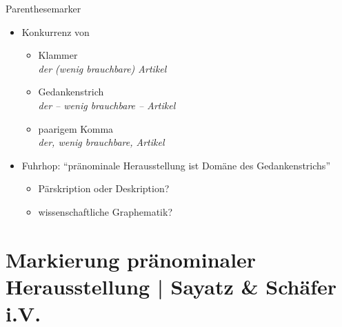 \begin{frame}
  {Parenthesemarker}
  \begin{itemize}[<+->]
    \item Konkurrenz von
      \begin{itemize}[<+->]
        \item Klammer\\
          \textit{\alert{der (wenig brauchbare) Artikel}}
        \item Gedankenstrich\\
          \textit{\alert{der -- wenig brauchbare -- Artikel}}
        \item paarigem Komma\\
          \textit{\alert{der, wenig brauchbare, Artikel}}
      \end{itemize}
      \Zeile
    \item Fuhrhop: ``pränominale Herausstellung ist Domäne des Gedankenstrichs''
      \begin{itemize}[<+->]
        \item Pärskription oder Deskription?
        \item wissenschaftliche Graphematik?
      \end{itemize}
  \end{itemize}
\end{frame}

\section[Herausstellung]{Markierung pränominaler Herausstellung | Sayatz \& Schäfer i.V.}

